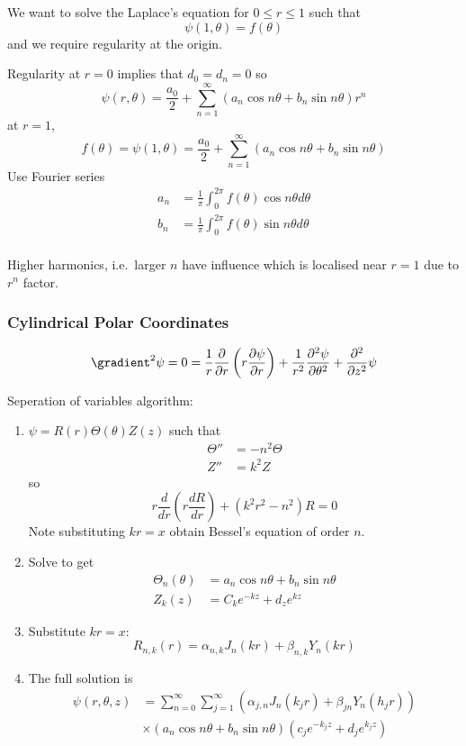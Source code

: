 \documentclass[a4paper]{article}
\newcommand*{\grad}{\gradient}
\newcommand*{\laplace}{\grad^2}
\newcommand*{\lap}{\laplace}
\begin{document}
We want to solve the Laplace's equation for \(0 \leq r \leq 1\) such that
\[
  \psi(1, \theta) = f(\theta)
\]
and we require regularity at the origin.

Regularity at \(r = 0\) implies that \(d_0 = d_n = 0\) so
\[
  \psi(r, \theta) = \frac{a_0}{2} + \sum_{n = 1}^{\infty}(a_n \cos n\theta + b_n \sin n\theta) r^n
\]
at \(r = 1\),
\[
  f(\theta) = \psi(1, \theta) = \frac{a_0}{2} + \sum_{n = 1}^{\infty}(a_n \cos n\theta + b_n \sin n\theta)
\]
Use Fourier series
\begin{align*}
  a_n &= \frac{1}{\pi} \int_{0}^{2\pi} f(\theta) \cos n\theta d\theta \\
  b_n &= \frac{1}{\pi} \int_{0}^{2\pi} f(\theta) \sin n\theta d\theta \\
\end{align*}

\begin{note}
  Higher harmonics, i.e.\ larger \(n\) have influence which is localised near \(r = 1\) due to \(r^n\) factor.
\end{note}

\subsubsection{Cylindrical Polar Coordinates}

\[
  \lap \psi = 0 = \frac{1}{r} \frac{\partial  }{\partial r} \left( r \frac{\partial \psi}{\partial r} \right) + \frac{1}{r^2} \frac{\partial^2 \psi}{\partial \theta^2} + \frac{\partial^2  }{\partial z^2} \psi
\]

Seperation of variables algorithm:
\begin{enumerate}
\item \(\psi = R(r) \Theta(\theta) Z(z)\) such that
  \begin{align*}
    \Theta'' &= -n^2 \Theta \\
    Z'' &= k^2 Z
  \end{align*}
  so
  \[
    r \frac{d}{dr} \left( r \frac{dR}{dr} \right) + (k^2r^2 - n^2)R = 0
  \]
  Note substituting \(kr = x\) obtain Bessel's equation of order \(n\).
\item Solve to get
  \begin{align*}
    \Theta_n(\theta) &= a_n \cos n\theta + b_n \sin n\theta \\
    Z_k(z) &= C_k e^{-kz} + d_z e^{kz}
  \end{align*}
\item Substitute \(kr = x\):
  \[
    R_{n,k}(r) = \alpha_{n, k} J_n(kr) + \beta_{n, k} Y_n(kr)
  \]
\item The full solution is
  \begin{align*}
    \psi(r, \theta, z) &= \sum_{n = 0}^{\infty} \sum_{j = 1}^{\infty} \left( \alpha_{j,n} J_n(k_jr) + \beta_{jn}Y_n(h_jr) \right) \\
    & \times (a_n \cos n\theta + b_n \sin n\theta ) (c_j e^{-k_j z} + d_j e^{k_j z})
  \end{align*}
\end{enumerate}
\end{document}
